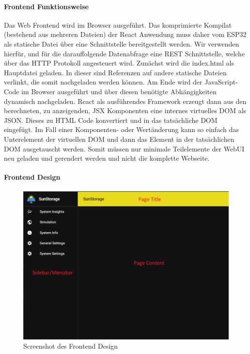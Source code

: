 \paragraph{Frontend Funktionsweise}
Das Web Frontend wird im Browser ausgeführt.
Das komprimierte Kompilat (bestehend aus mehreren Dateien) der React Anwendung muss daher vom ESP32 als statische Datei über eine Schnittstelle bereitgestellt werden.
Wir verwenden hierfür, und für die darauffolgende Datenabfrage eine REST Schnittstelle, welche über das HTTP Protokoll angesteuert wird.
Zunächst wird die index.html als Hauptdatei geladen.
In dieser sind Referenzen auf andere statische Dateien verlinkt, die somit nachgeladen werden können.
Am Ende wird der JavaScript-Code im Browser ausgeführt und über diesen benötigte Abhängigkeiten dynamisch nachgeladen.
React als ausführendes Framework erzeugt dann aus den berechneten, zu anzeigenden, JSX Komponenten eine internes virtuelles DOM als JSON.
Dieses zu HTML Code konvertiert und in das tatsächliche DOM eingefügt.
Im Fall einer Komponenten- oder Wertänderung kann so einfach das Unterelement der virtuellen DOM und dann das Element in der tatsächlichen DOM ausgetauscht werden.
Somit müssen nur minimale Teilelemente der WebUI neu geladen und gerendert werden und nicht die komplette Webseite.

\paragraph{Frontend Design}

\begin{figure}[htpb] %
    \centering
    \includegraphics[width=\textwidth,keepaspectratio=true]{pics/Screenshot_Frontend_Design.png}
    \caption{Screenshot des Frontend Design}
    \label{fig:ScreenshotFrontendDesign}
\end{figure}


